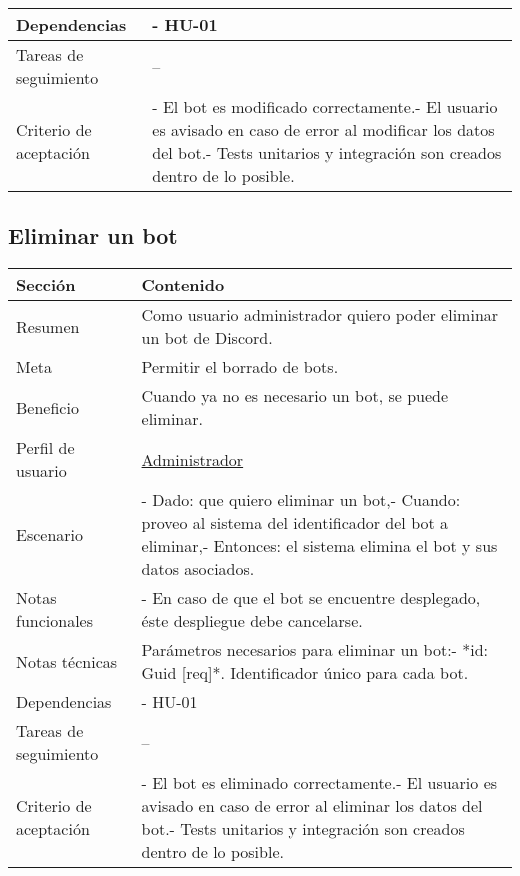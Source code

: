 \begin{table}[H]
\begin{adjustbox}{max width=\textwidth}
\begin{tabularx}{\textwidth}{|l|L|}
        Dependencias & - HU-01 \\ \hline
        Tareas de seguimiento & – \\ \hline
        Criterio de aceptación & - El bot es modificado correctamente.\linebreak - El usuario es avisado en caso de error al modificar los datos del bot.\linebreak - Tests unitarios y integración son creados dentro de lo posible. \\ \hline
    \end{tabularx}
    \end{adjustbox}
\end{table}

\subsection{Eliminar un bot}

\begin{table}[H]
    \centering
    \begin{adjustbox}{max width=\textwidth}
    \begin{tabularx}{\textwidth}{|l|L|}
    \hline
        Sección & Contenido \\ \hline
        Resumen & Como usuario administrador quiero poder eliminar un bot de Discord. \\ \hline
        Meta & Permitir el borrado de bots. \\ \hline
        Beneficio & Cuando ya no es necesario un bot, se puede eliminar. \\ \hline
        Perfil de usuario & \hyperref[sec:personaAdmin]{Administrador} \\ \hline
        Escenario & - Dado: que quiero eliminar un bot,\linebreak - Cuando: proveo al sistema del identificador del bot a eliminar,\linebreak - Entonces: el sistema elimina el bot y sus datos asociados. \\ \hline
        Notas funcionales & -  En caso de que el bot se encuentre desplegado, éste despliegue debe cancelarse. \\ \hline
        Notas técnicas & Parámetros necesarios para eliminar un bot:\linebreak - *id: Guid [req]*. Identificador único para cada bot. \\ \hline
        Dependencias & - HU-01 \\ \hline
        Tareas de seguimiento & – \\ \hline
        Criterio de aceptación & - El bot es eliminado correctamente.\linebreak - El usuario es avisado en caso de error al eliminar los datos del bot.\linebreak - Tests unitarios y integración son creados dentro de lo posible. \\ \hline
    \end{tabularx}
    \end{adjustbox}
\end{table}


